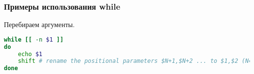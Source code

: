 \begin{frame}[fragile]
\frametitle{Примеры использования while}

\begin{block}{Перебираем аргументы.}
\begin{lstlisting}[language=bash,frame=single]
while [[ -n $1 ]]
do
    echo $1
    shift # rename the positional parameters $N+1,$N+2 ... to $1,$2 (N=1)
done
\end{lstlisting}
\end{block}

%
\end{frame}


